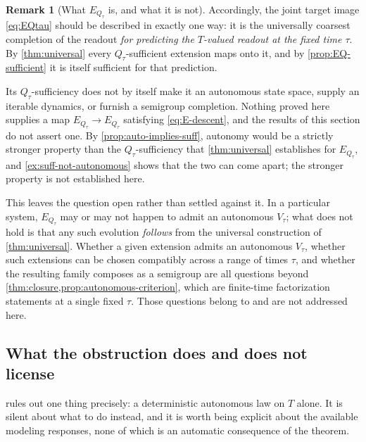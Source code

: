 \documentclass[11pt,reqno]{amsart}
\theoremstyle{plain}
\theoremstyle{definition}
\newtheorem{remark}[theorem]{Remark}
\newcommand{\Rdt}{T}
\begin{document}
\begin{remark}[What $E_{Q_\tau}$ is, and what it is not]\label{rem:EQtau-scope}
Accordingly, the joint target image \eqref{eq:EQtau} should be described in exactly one way: it is
the universally coarsest completion of the readout \emph{for predicting the $\Rdt$-valued readout
at the fixed time $\tau$}. By \cref{thm:universal} every $Q_\tau$-sufficient extension maps onto
it, and by \cref{prop:EQ-sufficient} it is itself sufficient for that prediction.

Its $Q_\tau$-sufficiency does not by itself make it an autonomous state space, supply an iterable
dynamics, or furnish a semigroup completion. Nothing proved here supplies a map
$E_{Q_\tau}\to E_{Q_\tau}$ satisfying \eqref{eq:E-descent}, and the results of this section do not
assert one. By \cref{prop:auto-implies-suff}, autonomy would be a strictly stronger property than
the $Q_\tau$-sufficiency that \cref{thm:universal} establishes for $E_{Q_\tau}$, and
\cref{ex:suff-not-autonomous} shows that the two can come apart; the stronger property is not
established here.

This leaves the question open rather than settled against it. In a particular system,
$E_{Q_\tau}$ may or may not happen to admit an autonomous $V_\tau$; what does not hold is that any
such evolution \emph{follows} from the universal construction of \cref{thm:universal}. Whether a
given extension admits an autonomous $V_\tau$, whether such extensions can be chosen compatibly
across a range of times $\tau$, and whether the resulting family composes as a semigroup are all
questions beyond \cref{thm:closure,prop:autonomous-criterion}, which are finite-time factorization
statements at a single fixed $\tau$. Those questions belong to \cite{ShadowV} and are not
addressed here.
\end{remark}

\subsection{What the obstruction does and does not license}

 rules out one thing precisely: a deterministic autonomous law on
$\Rdt$ alone. It is silent about what to do instead, and it is worth being explicit about the
available modeling responses, none of which is an automatic consequence of the theorem.
\end{document}
